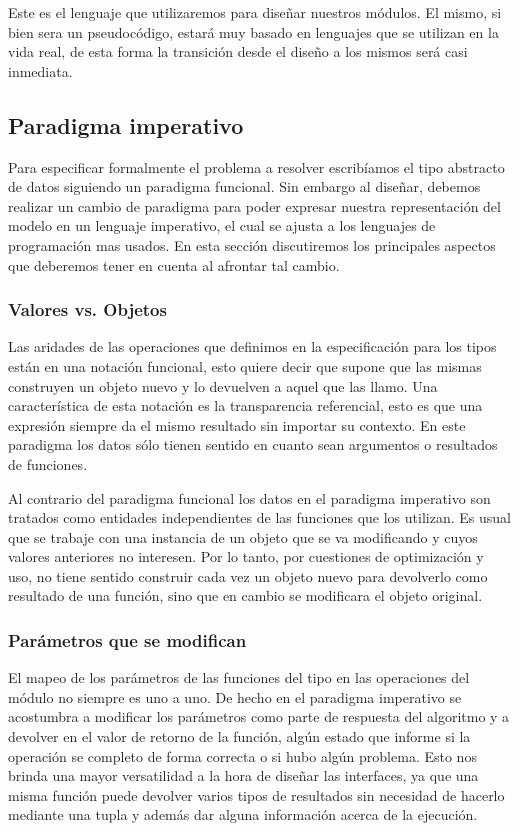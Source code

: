 Este es el lenguaje que utilizaremos para dise\~nar nuestros m\'odulos. El mismo, si bien sera un pseudoc\'odigo, estar\'a muy basado en lenguajes que se utilizan en la vida real, de esta forma la transici\'on desde el dise\~no a los mismos ser\'a casi inmediata.

\subsection{Paradigma imperativo}

Para especificar formalmente el problema a resolver escrib\'iamos el tipo abstracto de datos siguiendo un paradigma funcional. Sin embargo al dise\~nar, debemos realizar un cambio de paradigma para poder expresar nuestra representaci\'on del modelo en un lenguaje imperativo, el cual se ajusta a los lenguajes de programaci\'on mas usados. En esta secci\'on discutiremos los principales aspectos que deberemos tener en cuenta al afrontar tal cambio.

\subsubsection*{Valores vs. Objetos}

Las aridades de las operaciones que definimos en la especificaci\'on para los tipos est\'an en una notaci\'on funcional, esto quiere decir que supone que las mismas construyen un objeto nuevo y lo devuelven a aquel que las llamo. Una caracter\'istica de esta notaci\'on es la transparencia referencial, esto es que una expresi\'on siempre da el mismo resultado sin importar su contexto. En este paradigma los datos s\'olo tienen sentido en cuanto sean argumentos o resultados de funciones.

Al contrario del paradigma funcional los datos en el paradigma imperativo son tratados como entidades independientes de las funciones que los utilizan. Es usual que se trabaje con una instancia de un objeto que se va modificando y cuyos valores anteriores no interesen. Por lo tanto, por cuestiones de optimizaci\'on y uso, no tiene sentido construir cada vez un objeto nuevo para devolverlo como resultado de una funci\'on, sino que en cambio se modificara el objeto original.

\subsubsection*{Par\'ametros que se modifican}

El mapeo de los par\'ametros de las funciones del tipo en las operaciones del m\'odulo no siempre es uno a uno. De hecho en el paradigma imperativo se acostumbra a modificar los par\'ametros como parte de respuesta del algoritmo y a devolver en el valor de retorno de la funci\'on, alg\'un estado que informe si la operaci\'on se completo de forma correcta o si hubo alg\'un problema. Esto nos brinda una mayor versatilidad a la hora de dise\~nar las interfaces, ya que una misma funci\'on puede devolver varios tipos de resultados sin necesidad de hacerlo mediante una tupla y adem\'as dar alguna informaci\'on acerca de la ejecuci\'on.

